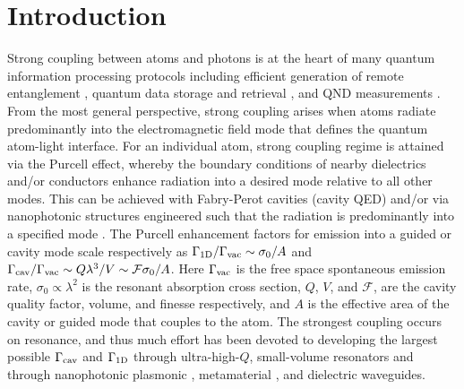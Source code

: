 \documentclass[preprint, aps,pra,onecolumn]{revtex4-1} %
\newcommand{\oneD}{{\rm 1D}}
\newcommand{\vac}{{\rm vac}}
\newcommand{\cav}{{\rm cav}}
\begin{document}
\maketitle

\section{Introduction}

Strong coupling between atoms and photons is at the heart of many quantum information processing protocols including efficient generation of remote entanglement \cite{duan_long-distance_2001, julsgaard_experimental_2001}, quantum data storage and retrieval \cite{ eisaman_electromagnetically_2005}, and QND measurements \cite{eckert_quantum_2008}.  
From the most general perspective, strong coupling arises when atoms radiate predominantly into the electromagnetic field mode that defines the quantum atom-light interface.  
For an individual atom, strong coupling regime is attained via the Purcell effect, whereby the boundary conditions of nearby dielectrics and/or conductors enhance radiation into a desired mode relative to all other modes.  
This can be achieved with Fabry-Perot cavities (cavity QED) \cite{miller_trapped_2005} and/or via nanophotonic structures engineered such that the radiation is predominantly into a specified mode \cite{manga_rao_single_2007, hakuta_manipulating_2012, hung_trapped_2013}.  The Purcell enhancement factors for emission into a guided or cavity mode scale respectively as  $ \Gamma_{\oneD}/\Gamma_{\vac} \sim \sigma_0/A$ and  $\Gamma_{\cav}/\Gamma_{\vac} \sim   Q \lambda^3/V \sim \mathcal{F}  \sigma_0/A$.  Here $\Gamma_{\vac}$ is the free space spontaneous emission rate, $\sigma_0 \propto \lambda^2$ is the resonant absorption cross section, $Q$, $V$, and $\mathcal{F}$,  are the cavity quality factor, volume, and finesse respectively, and $A$ is the effective area of the cavity or guided mode that couples to the atom.  The strongest coupling occurs on resonance, and thus much effort has been devoted to developing the largest possible $\Gamma_{\cav}$ and $\Gamma_{\oneD}$ through ultra-high-$Q$, small-volume resonators \cite{raimond_manipulating_2001, wallraff_strong_2004, miller_trapped_2005} and through nanophotonic plasmonic \cite{dzsotjan_quantum_2010, tame_quantum_2013}, metamaterial \cite{yao_ultrahigh_2009}, and dielectric \cite{hung_trapped_2013, goban_atomlight_2014} waveguides.   
\end{document}
